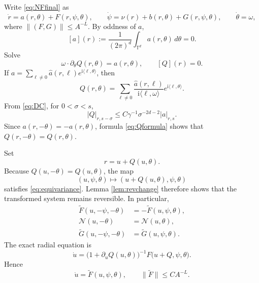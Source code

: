 \documentclass[11pt]{amsart}
\theoremstyle{remark}
\newcommand{\T}{\mathbb T}
\newcommand{\ii}{\mathrm i}
\newcommand{\norm}[1]{\lVert #1\rVert}
\begin{document}
Write \eqref{eq:NFfinal} as
\begin{equation}\label{eq:averageSystem}
 \dot r=a(r,\theta)+F(r,\psi,\theta),\qquad
 \dot\psi=\nu(r)+b(r,\theta)+G(r,\psi,\theta),\qquad
 \dot\theta=\omega,
\end{equation}
where $\norm{(F,G)}\leq A^{-L}$.
By oddness of $a$,
\begin{equation}\label{eq:amean}
 [a](r):=\frac1{(2\pi)^d}\int_{\T^d}a(r,\theta)\,d\theta=0.
\end{equation}
Solve
\begin{equation}\label{eq:Qeq}
 \omega\cdot\partial_\theta Q(r,\theta)=a(r,\theta),
 \qquad [Q](r)=0.
\end{equation}
If
$a=\sum_{\ell\neq0}\widehat a(r,\ell)e^{\ii\langle\ell,\theta\rangle}$,
then
\begin{equation}\label{eq:Qformula}
 Q(r,\theta)=
 \sum_{\ell\neq0}
 \frac{\widehat a(r,\ell)}
 {\ii\langle\ell,\omega\rangle}
 e^{\ii\langle\ell,\theta\rangle}.
\end{equation}
From \eqref{eq:DC}, for $0<\sigma<s$,
\begin{equation}\label{eq:Qestimate}
 |Q|_{r,s-\sigma}
 \leq C\gamma^{-1}\sigma^{-2d-2}|a|_{r,s}.
\end{equation}
Since $a(r,-\theta)=-a(r,\theta)$, formula
\eqref{eq:Qformula} shows that $Q(r,-\theta)=Q(r,\theta)$.

Set
\begin{equation}\label{eq:rQ}
 r=u+Q(u,\theta).
\end{equation}
Because $Q(u,-\theta)=Q(u,\theta)$, the map
\[
 (u,\psi,\theta)\longmapsto
 (u+Q(u,\theta),\psi,\theta)
\]
satisfies \eqref{eq:equivariance}.  Lemma \ref{lem:revchange} therefore
shows that the transformed system remains reversible.  In particular,
\begin{equation}\label{eq:tildeParity}
 \begin{aligned}
 \widetilde F(u,-\psi,-\theta)
 &=-\widetilde F(u,\psi,\theta),\\
 \mathcal N(u,-\theta)&=\mathcal N(u,\theta),\\
 \widetilde G(u,-\psi,-\theta)
 &=\widetilde G(u,\psi,\theta).
 \end{aligned}
\end{equation}
The exact radial equation is
\begin{equation}\label{eq:uexact}
 \dot u=
 \bigl(1+\partial_uQ(u,\theta)\bigr)^{-1}
 F\bigl(u+Q,\psi,\theta\bigr).
\end{equation}
Hence
\begin{equation}\label{eq:utilde}
 \dot u=\widetilde F(u,\psi,\theta),\qquad
 \norm{\widetilde F}\leq CA^{-L}.
\end{equation}
\end{document}
